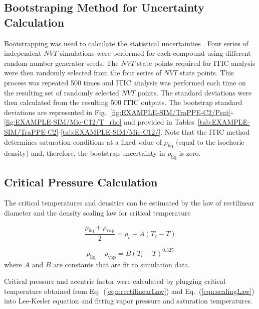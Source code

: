 \documentclass[%
 aip,
 jcp,
 sd,%
 amsmath,amssymb,
 reprint,%
]{revtex4-1}
\begin{document}
\subsection{Bootstraping Method for Uncertainty Calculation}\label{sec:bootstrapping}
Bootstrapping was used to calculate the statistical uncertainties \cite{Efron1981}. Four series of independent $NVT$ simulations were performed for each compound using different random number generator seeds. The $NVT$ state points required for ITIC analysis were then randomly selected from the four series of $NVT$ state points. This process was repeated 500 times and ITIC analysis was performed each time on the resulting set of randomly selected $NVT$ points. The standard deviations were then calculated from the resulting 500 ITIC outputs. 
The bootstrap standard deviations are represented in Fig.~\ref{fig:EXAMPLE-SIM/TraPPE-C2/Psat}-\ref{fig:EXAMPLE-SIM/Mie-C12/T_rho} and provided in Tables~\ref{tab:EXAMPLE-SIM/TraPPE-C2}-\ref{tab:EXAMPLE-SIM/Mie-C12/}. 
Note that the ITIC method determines saturation conditions at a fixed value of $\rho_{\mathrm{liq}}$ (equal to the isochoric density) and, therefore, the bootstrap uncertainty in $\rho_{\mathrm{liq}}$ is zero.

\subsection{Critical Pressure Calculation}\label{sec:PcCalc}
The critical temperatures and densities can be estimated by the law of rectilinear diameter \cite{Rowlinson1982} and the density scaling law \cite{Rowlinson2013} for critical temperature

\begin{equation}
\frac{\rho_{\mathrm{liq}} +\rho_{\mathrm{vap}}}{2}=\rho_c+A(T_c-T)
\label{eqn:rectilinearLaw}
\end{equation}

\begin{equation}
\rho_{\mathrm{liq}} -\rho_{\mathrm{vap}}=B(T_c-T)^{0.325}
\label{eqn:scalingLaw}
\end{equation}
where $A$ and $B$ are constants that are fit to simulation data.

Critical pressure and acentric factor were calculated by plugging critical temperature obtained from Eq.~(\ref{eqn:rectilinearLaw}) and Eq.~(\ref{eqn:scalingLaw}) into Lee-Kesler equation \cite{Lee1975} and fitting vapor pressure and saturation temperatures.
			
\end{document}

